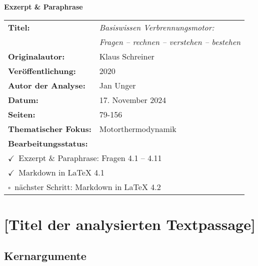 \documentclass[a4paper,12pt]{article}
\newcommand{\checkbox}{$\square$}
\newcommand{\checkedbox}{$\checkmark$}
\begin{document}
\thispagestyle{empty}

\begin{center}
    {\huge\sffamily\bfseries Exzerpt \& Paraphrase\par}
    
    \vspace{2.5cm}
    
    \begin{tabular}{ll}
        \textbf{Titel:} & \textit{Basiswissen Verbrennungsmotor:} \\
        & \textit{Fragen -- rechnen -- verstehen -- bestehen} \\[0.5cm]
        \textbf{Originalautor:} & Klaus Schreiner \\[0.5cm]
        \textbf{Veröffentlichung:} & 2020 \\[0.5cm]
        \textbf{Autor der Analyse:} & Jan Unger \\[0.5cm]
        \textbf{Datum:} & 17. November 2024 \\[0.5cm]
        \textbf{Seiten:} & 79-156 \\[0.5cm]
        \textbf{Thematischer Fokus:} & Motorthermodynamik \\[0.5cm]
        \multicolumn{2}{l}{\textbf{Bearbeitungsstatus:}} \\[0.2cm]
        \multicolumn{2}{l}{\checkedbox~Exzerpt \& Paraphrase: Fragen 4.1 -- 4.11} \\
        \multicolumn{2}{l}{\checkedbox~Markdown in LaTeX 4.1} \\
        \multicolumn{2}{l}{\checkbox~nächster Schritt: Markdown in LaTeX 4.2}
    \end{tabular}
\end{center}

\newpage
\tableofcontents
\newpage


\section{[Titel der analysierten Textpassage]}

\subsection{Kernargumente}
\end{document}
